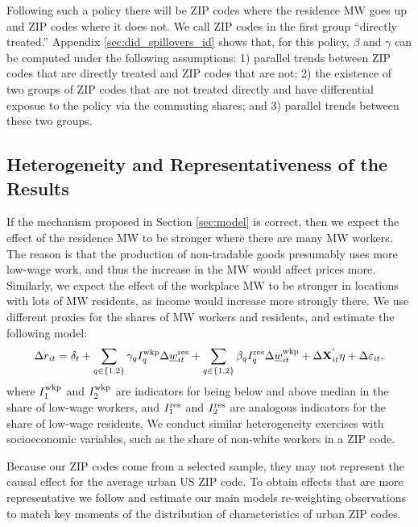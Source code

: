 Following such a policy there will be ZIP codes where the residence MW goes up
and ZIP codes where it does not.
We call ZIP codes in the first group ``directly treated.''
Appendix \ref{sec:did_spillovers_id} shows that, for this policy, 
$\beta$ and $\gamma$ can be computed under the following assumptions: 
1) parallel trends between ZIP codes that are directly treated and ZIP codes 
that are not;
2) the existence of two groups of ZIP codes that are not treated directly and
have differential exposue to the policy via the commuting shares; and 
3) parallel trends between these two groups.


\subsection{Heterogeneity and Representativeness of the Results}

If the mechanism proposed in Section \ref{sec:model} is correct, then we
expect the effect of the residence MW to be stronger where there are many MW 
workers.
The reason is that the production of non-tradable goods presumably uses more
low-wage work, and thus the increase in the MW would affect prices more.
Similarly, we expect the effect of the workplace MW to be stronger in locations
with lots of MW residents, as income would increase more strongly there.
We use different proxies for the shares of MW workers and residents, and 
estimate the following model:
\begin{equation}\label{eq:fd_heterogeneity}
    \Delta r_{it} = \delta_t
                  + \sum_{q\in\{1,2\}}\gamma_q I^{\text{wkp}}_q \Delta \underline{w}^{\text{res}}_{it}
                  + \sum_{q\in\{1,2\}}\beta_q I^{\text{res}}_q \Delta \underline{w}^{\text{wkp}}_{it}
                  + \Delta \mathbf{X}^{'}_{it}\eta
                  + \Delta \varepsilon_{it} ,
\end{equation}
where 
$I^{\text{wkp}}_1$ and $I^{\text{wkp}}_2$ are indicators for being below and above median 
in the share of low-wage workers, and
$I^{\text{res}}_1$ and $I^{\text{res}}_2$ are analogous indicators for the share of low-wage
residents.
We conduct similar heterogeneity exercises with socioeconomic variables, 
such as the share of non-white workers in a ZIP code.

Because our ZIP codes come from a selected sample, they may not represent
the causal effect for the average urban US ZIP code.
To obtain effects that are more representative we follow 
\textcite{Hainmueller2012} and estimate our main models re-weighting 
observations to match key moments of the distribution of characteristics of 
urban ZIP codes.


